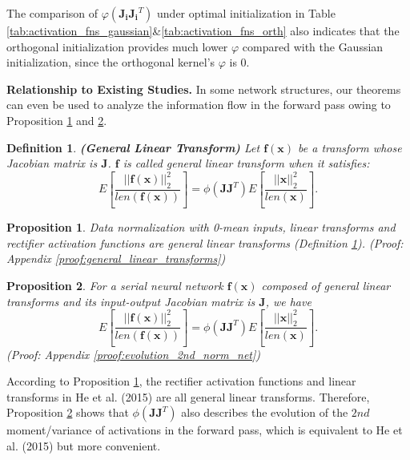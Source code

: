 \documentclass[10pt,journal,compsoc]{IEEEtran}
\newcommand{\modify}[1]{{ #1}}
\newtheorem{definition}{Definition}[section]
\newtheorem{prop}{Proposition}[section]
\begin{document}
The comparison of $\varphi(\mathbf{J_iJ_i}^T)$ under optimal initialization in Table \ref{tab:activation_fns_gaussian}\&\ref{tab:activation_fns_orth} also indicates that the orthogonal initialization provides much lower $\varphi$ compared with the Gaussian initialization, since the orthogonal kernel's $\varphi$ is $0$.

\modify{
\textbf{Relationship to Existing Studies.} In some network structures, our theorems can even be used to analyze the information flow in the forward pass owing to Proposition \ref{prop:general_linear_transforms} and \ref{prop:evolution_2nd_norm_net }.

\begin{definition}
\textbf{(General Linear Transform)} Let $\mathbf{f}(\mathbf{x})$ be a transform whose Jacobian matrix is $\mathbf{J}$. $\mathbf{f}$ is called general linear transform when it satisfies:
\begin{equation}
    E\left[\frac{||\mathbf{f}(\mathbf{x})||_2^2}{len(\mathbf{f}(\mathbf{x}))}\right] = \phi\left(\mathbf{JJ}^T\right)E\left[\frac{||\mathbf{x}||_2^2}{len(\mathbf{x})}\right].
\end{equation}
\label{def:general_linear_transformation}
\end{definition}

\begin{prop}
Data normalization with 0-mean inputs, linear transforms and rectifier activation functions are general linear transforms (Definition \ref{def:general_linear_transformation}). (Proof: Appendix \ref{proof:general_linear_transforms})
\label{prop:general_linear_transforms}
\end{prop}

\begin{prop}
    For a serial neural network $\mathbf{f}(\mathbf{x})$ composed of general linear transforms and its input-output Jacobian matrix is $\mathbf{J}$, we have
    \begin{equation}
    E\left[\frac{||\mathbf{f}(\mathbf{x})||_2^2}{len(\mathbf{f}(\mathbf{x}))}\right] = \phi\left(\mathbf{JJ}^T\right)E\left[\frac{||\mathbf{x}||_2^2}{len(\mathbf{x})}\right].
    \end{equation}
    (Proof: Appendix \ref{proof:evolution_2nd_norm_net})
\label{prop:evolution_2nd_norm_net }
\end{prop}

According to Proposition \ref{prop:general_linear_transforms}, the rectifier activation functions and linear transforms in He et al. (2015) \cite{he2015delving} are all general linear transforms. Therefore, Proposition \ref{prop:evolution_2nd_norm_net } shows that $\phi(\mathbf{JJ}^T)$ also describes the evolution of the $2{nd}$ moment/variance of activations in the forward pass, which is equivalent to He et al. (2015) \cite{he2015delving} but more convenient.
}
\end{document}
